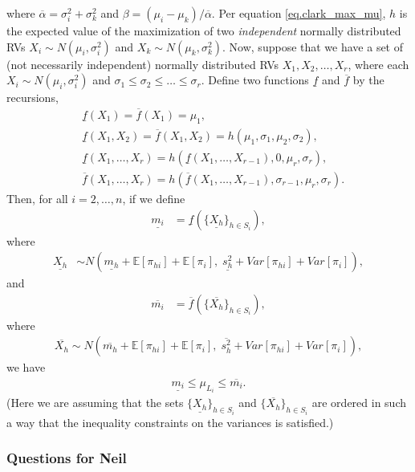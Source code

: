 \documentclass[12pt]{article}
\def\E{\mathbb{E}}
\begin{document}
where $\overline{\alpha} = \sigma_i^2 + \sigma_k^2$ and $\beta = (\mu_i - \mu_k)/ \overline{\alpha}$. Per equation \eqref{eq.clark_max_mu}, $h$ is the expected value of the maximization of two {\em independent} normally distributed RVs $X_i \sim N(\mu_i, \sigma_i^2)$ and $X_k \sim N(\mu_k, \sigma_k^2)$. Now, suppose that we have a set of (not necessarily independent) normally distributed RVs $X_1, X_2, \dots, X_r$, where each $X_i \sim N(\mu_i, \sigma_i^2)$ and $\sigma_1 \leq \sigma_2 \leq \dots \leq \sigma_r$. Define two functions $\underline{f}$ and $\overline{f}$ by the recursions,
\begin{align*}
  &\underline{f}(X_1) = \overline{f}(X_1) = \mu_1, \\
  &\underline{f}(X_1, X_2) = \overline{f}(X_1, X_2) = h(\mu_1, \sigma_1, \mu_2, \sigma_2), \\
  &\underline{f}(X_1, \dots, X_r) = h(\underline{f}(X_1, \dots, X_{r - 1}), 0, \mu_r, \sigma_r), \\
  &\overline{f}(X_1, \dots, X_r) = h(\overline{f}(X_1, \dots, X_{r - 1}), \sigma_{r - 1}, \mu_r, \sigma_r).
\end{align*}
Then, for all $i = 2, \dots, n$, if we define
\begin{align*}
  \underline{m_i} &= \underline{f}(\{ \underline{X_h} \}_{h \in S_i}),
\end{align*}
where
\begin{align*}
  \underline{X_h} &\sim N(\underline{m_h} + \E[\pi_{hi}] + \E[\pi_{i}], \; \underline{s_h^2} + Var[\pi_{hi}] + Var[\pi_{i}]),
\end{align*}
and
\begin{align*}
  \overline{m_i} &= \overline{f}(\{\overline{X_h}\}_{h \in S_i}),
\end{align*}
where
\begin{align*}
  \overline{X_h} \sim N(\overline{m_h} + \E[\pi_{hi}] + \E[\pi_{i}], \; \overline{s_h^2} + Var[\pi_{hi}] + Var[\pi_{i}]),
  \end{align*}
we have 
\begin{align*}
  \underline{m_i} \leq \mu_{L_i} \leq \overline{m_i}.
\end{align*}
(Here we are assuming that the sets $\{\underline{X_h}\}_{h \in S_i}$ and $\{\overline{X_h}\}_{h \in S_i}$ are ordered in such a way that the inequality constraints on the variances is satisfied.)

\subsubsection*{Questions for Neil}
\end{document}
